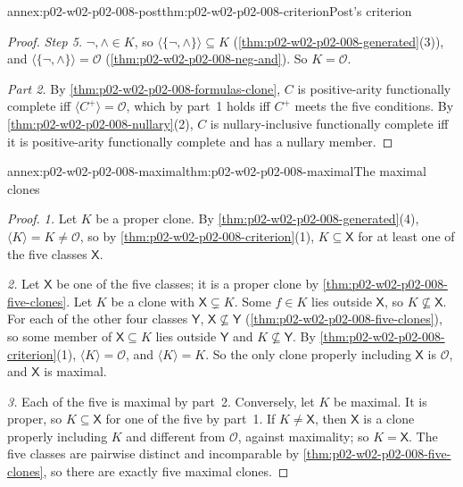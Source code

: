 \begin{annexitem}{annex:p02-w02-p02-008-post}{thm:p02-w02-p02-008-criterion}{Post's criterion}
\begin{proof}
\emph{Step 5.}  \(\neg,\land\in K\), so
\(\langle\{\neg,\land\}\rangle\subseteq K\)
(\cref{thm:p02-w02-p02-008-generated}(3)), and
\(\langle\{\neg,\land\}\rangle=\mathcal O\)
(\cref{thm:p02-w02-p02-008-neg-and}).  So \(K=\mathcal O\).

\emph{Part 2.}  By \cref{thm:p02-w02-p02-008-formulas-clone}, \(C\) is
positive-arity functionally complete iff \(\langle C^+\rangle=\mathcal O\),
which by part~1 holds iff \(C^+\) meets the five conditions.  By
\cref{thm:p02-w02-p02-008-nullary}(2), \(C\) is nullary-inclusive
functionally complete iff it is positive-arity functionally complete and has
a nullary member.
\end{proof}
\end{annexitem}

\begin{annexitem}{annex:p02-w02-p02-008-maximal}{thm:p02-w02-p02-008-maximal}{The maximal clones}
\begin{proof}
\emph{1.}  Let \(K\) be a proper clone.  By
\cref{thm:p02-w02-p02-008-generated}(4), \(\langle K\rangle=K\neq\mathcal
O\), so by \cref{thm:p02-w02-p02-008-criterion}(1), \(K\subseteq\mathsf X\)
for at least one of the five classes \(\mathsf X\).

\emph{2.}  Let \(\mathsf X\) be one of the five classes; it is a proper clone
by \cref{thm:p02-w02-p02-008-five-clones}.  Let \(K\) be a clone with
\(\mathsf X\subsetneq K\).  Some \(f\in K\) lies outside \(\mathsf X\), so
\(K\not\subseteq\mathsf X\).  For each of the other four classes
\(\mathsf Y\), \(\mathsf X\not\subseteq\mathsf Y\)
(\cref{thm:p02-w02-p02-008-five-clones}), so some member of
\(\mathsf X\subseteq K\) lies outside \(\mathsf Y\) and
\(K\not\subseteq\mathsf Y\).  By \cref{thm:p02-w02-p02-008-criterion}(1),
\(\langle K\rangle=\mathcal O\), and \(\langle K\rangle=K\).  So the only
clone properly including \(\mathsf X\) is \(\mathcal O\), and \(\mathsf X\)
is maximal.

\emph{3.}  Each of the five is maximal by part~2.  Conversely, let \(K\) be
maximal.  It is proper, so \(K\subseteq\mathsf X\) for one of the five by
part~1.  If \(K\neq\mathsf X\), then \(\mathsf X\) is a clone properly
including \(K\) and different from \(\mathcal O\), against maximality; so
\(K=\mathsf X\).  The five classes are pairwise distinct and incomparable by
\cref{thm:p02-w02-p02-008-five-clones}, so there are exactly five maximal
clones.
\end{proof}
\end{annexitem}

